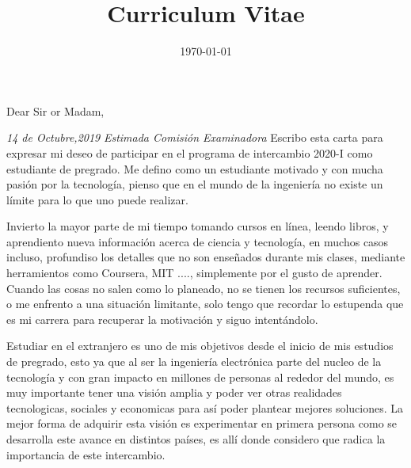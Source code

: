 \documentclass[12pt,a4paper,roman]{moderncv} %
\title{Curriculum Vitae}
\begin{document}


\clearpage

\date{\today} %
\opening{Dear Sir or Madam,} %

\justify
\textit{14 de Octubre,2019}\newline\newline
\textit{Estimada Comisión Examinadora}\newline\newline
Escribo esta carta para expresar mi deseo de participar en el programa de intercambio 2020-I como estudiante de pregrado. Me defino como un estudiante motivado y con mucha pasión por la tecnología, pienso que en el mundo de la ingeniería no existe un límite para lo que uno puede realizar.

Invierto la mayor parte de mi tiempo tomando cursos en línea, leendo libros, y aprendiento nueva información acerca de ciencia y tecnología, en muchos casos incluso, profundiso los detalles que no son enseñados durante mis clases, mediante herramientos como Coursera, MIT ...., simplemente por el gusto de aprender. Cuando las cosas no salen como lo planeado, no se tienen los recursos suficientes, o me enfrento a una situación limitante, solo tengo que recordar lo estupenda que es mi carrera para recuperar la motivación y siguo intentándolo.

Estudiar en el extranjero es uno de mis objetivos desde el inicio de mis estudios de pregrado, esto ya que al ser la ingeniería electrónica parte del nucleo de la tecnología y con gran impacto en millones de personas al rededor del mundo, es muy importante tener una visión amplia y poder ver otras realidades tecnologicas, sociales y economicas para así poder plantear mejores soluciones. La mejor forma de adquirir esta visión es experimentar en primera persona como se desarrolla este avance en distintos países, es allí donde considero que radica la importancia de este intercambio.
\end{document}
